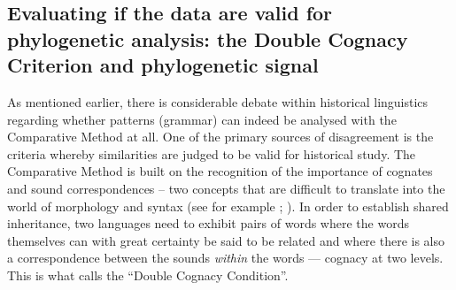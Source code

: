\documentclass[12pt,letterpaper]{article}
\begin{document}






\FloatBarrier
\subsection{Evaluating if the data are valid for phylogenetic analysis: the Double Cognacy Criterion and phylogenetic signal}
\label{sec:is_it_valid}

As mentioned earlier, there is considerable debate within historical linguistics regarding whether patterns (grammar) can indeed be analysed with the Comparative Method at all. One of the primary sources of disagreement is the criteria whereby similarities are judged to be valid for historical study. The Comparative Method is built on the recognition of the importance of cognates and sound correspondences -- two concepts that are difficult to translate into the world of morphology and syntax (see for example \citealt{harris2008reconstruction}; \citealt{walkden_2013}). In order to establish shared inheritance, two languages need to exhibit pairs of words where the words themselves can with great certainty be said to be related and where there is also a correspondence between the sounds \textit{within} the words --- cognacy at two levels. This is what \citet[101]{walkden_2013} calls the ``Double Cognacy Condition''. 
\end{document}
